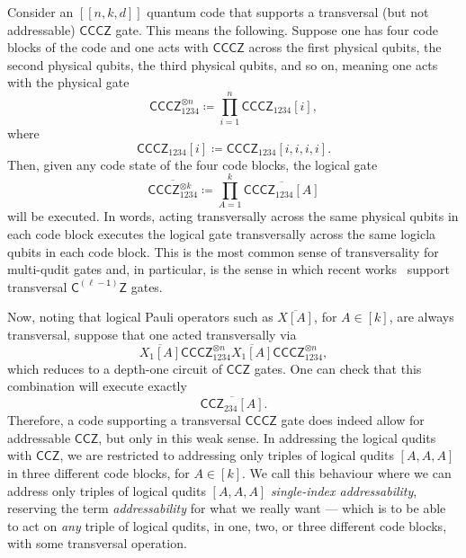 \documentclass[11pt]{article}
\theoremstyle{definition}
\newcommand{\CCZ}{\mathsf{CCZ}}
\newcommand{\CCCZ}{\mathsf{CCCZ}}
\newcommand{\CLZ}{\mathsf{C^{(\ell-1)}Z}}
\begin{document}
Consider an $[[n,k,d]]$ quantum code that supports a transversal (but not addressable) $\CCCZ$ gate. This means the following. Suppose one has four code blocks of the code and one acts with $\CCCZ$ across the first physical qubits, the second physical qubits, the third physical qubits, and so on, meaning one acts with the physical gate
\begin{equation}\label{eq:CCCZ_fixed_interblock}
    \CCCZ_{1234}^{\otimes n} \coloneq \prod_{i=1}^n\CCCZ_{1234}[i],
\end{equation}
where
\begin{equation}
    \CCCZ_{1234}[i]\coloneq \CCCZ_{1234}[i,i,i,i].
\end{equation}
Then, given any code state of the four code blocks, the logical gate
\begin{equation}\label{eq:CCCZ_fixed_interblock_logical}
    \overline{\CCCZ_{1234}^{\otimes k}} \coloneq \prod_{A=1}^k\overline{\CCCZ_{1234}[A]}
\end{equation}
will be executed. In words, acting transversally across the same physical qubits in each code block executes the logical gate transversally across the same logicla qubits in each code block. This is the most common sense of transversality for multi-qudit gates and, in particular, is the sense in which recent works~\cite{golowich2024asymptoticallygoodquantumcodes,nguyen2024goodbinaryquantumcodes,golowich2024quantum} support transversal $\CLZ$ gates.

Now, noting that logical Pauli operators such as $\overline{X[A]}$, for $A \in [k]$, are always transversal, suppose that one acted transversally via
\begin{equation}\label{eq:CCZ_fixed_interblock_first}
    \overline{X_1[A]}\CCCZ_{1234}^{\otimes n}\overline{X_1[A]}\CCCZ_{1234}^{\otimes n},
\end{equation}
which reduces to a depth-one circuit of $\CCZ$ gates.
One can check that this combination will execute exactly
\begin{equation}
    \overline{\CCZ_{234}[A]}.
\end{equation}
Therefore, a code supporting a transversal $\CCCZ$ gate does indeed allow for addressable $\CCZ$, but only in this weak sense. In addressing the logical qudits with $\CCZ$, we are restricted to addressing only triples of logical qudits $[A,A,A]$ in three different code blocks, for $A \in [k]$. 
We call this behaviour where we can address only triples of logical qudits $[A,A,A]$ \textit{single-index addressability}, reserving the term \textit{addressability} for what we really want --- which is to be able to act on \textit{any} triple of logical qudits, in one, two, or three different code blocks, with some transversal operation.
\end{document}
